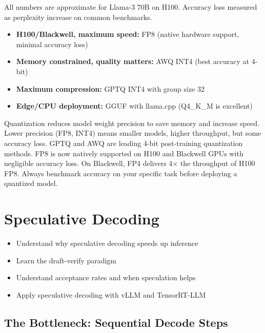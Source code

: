 \documentclass[11pt, twoside, openright]{book}
\newcommand{\tipbox}[2]{\begin{tcolorbox}[tipstyle, title={#1}]#2\end{tcolorbox}}
\newenvironment{learningobjectives}
  {\begin{tcolorbox}[enhanced, breakable,
    colback={rgb,255:red,232;green,240;blue,255},
    colframe=NavyBlue, boxrule=1.5pt, arc=4pt,
    title={\bfseries Learning Objectives},
    fonttitle=\bfseries\color{white},
    attach boxed title to top left={yshift=-2mm, xshift=5mm},
    boxed title style={colback=NavyBlue, arc=2pt}]
  \begin{itemize}[leftmargin=1.5em, itemsep=2pt]}
  {\end{itemize}\end{tcolorbox}}
\newenvironment{chapsummary}
  {\begin{tcolorbox}[enhanced, breakable,
    colback={rgb,255:red,245;green,245;blue,225},
    colframe=AccentOrange, boxrule=1.5pt, arc=4pt,
    title={\bfseries Chapter Summary},
    fonttitle=\bfseries\color{white},
    attach boxed title to top left={yshift=-2mm, xshift=5mm},
    boxed title style={colback=AccentOrange, arc=2pt}]}
  {\end{tcolorbox}}
\begin{document}
\noindent All numbers are approximate for Llama-3 70B on H100.  Accuracy loss
measured as perplexity increase on common benchmarks.

\tipbox{Which Quantization to Choose?}{
\begin{itemize}
  \item \textbf{H100/Blackwell, maximum speed:} FP8 (native hardware support,
        minimal accuracy loss)
  \item \textbf{Memory constrained, quality matters:} AWQ INT4 (best accuracy
        at 4-bit)
  \item \textbf{Maximum compression:} GPTQ INT4 with group size 32
  \item \textbf{Edge/CPU deployment:} GGUF with llama.cpp (Q4\_K\_M is excellent)
\end{itemize}
}

\begin{chapsummary}
Quantization reduces model weight precision to save memory and increase speed.
Lower precision (FP8, INT4) means smaller models, higher throughput, but some
accuracy loss.  GPTQ and AWQ are leading 4-bit post-training quantization methods.
FP8 is now natively supported on H100 and Blackwell GPUs with negligible accuracy
loss.  On Blackwell, FP4 delivers 4$\times$ the throughput of H100 FP8.  Always
benchmark accuracy on your specific task before deploying a quantized model.
\end{chapsummary}

\chapter{Speculative Decoding}
\label{ch:speculative}

\begin{learningobjectives}
  \item Understand why speculative decoding speeds up inference
  \item Learn the draft-verify paradigm
  \item Understand acceptance rates and when speculation helps
  \item Apply speculative decoding with vLLM and TensorRT-LLM
\end{learningobjectives}

\section{The Bottleneck: Sequential Decode Steps}
\end{document}

